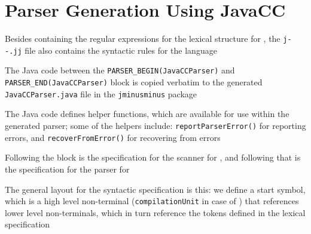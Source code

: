 \documentclass[8pt,a4paper,compress]{beamer}
\begin{document}
\section{Parser Generation Using JavaCC}
\begin{frame}[fragile]
\pause

Besides containing the regular expressions for the lexical structure for \jmm, the \lstinline{j--.jj} file also contains the syntactic rules for the language

\pause
\bigskip

The Java code between the \lstinline{PARSER_BEGIN(JavaCCParser)} and \lstinline{PARSER_END(JavaCCParser)} block is copied verbatim to the generated \lstinline{JavaCCParser.java} file in the \lstinline{jminusminus} package

\pause
\bigskip

The Java code defines helper functions, which are available for use within the generated parser; some of the helpers include: \lstinline{reportParserError()} for reporting errors, and \lstinline{recoverFromError()} for recovering from errors

\pause
\bigskip

Following the block is the specification for the scanner for \jmm, and following that is the specification for the parser for \jmm

\pause
\bigskip

The general layout for the syntactic specification is this: we define a start symbol, which is a high level non-terminal (\lstinline{compilationUnit} in case of \jmm) that references lower level non-terminals, which in turn reference the tokens defined in the lexical specification
\end{frame}
\end{document}
